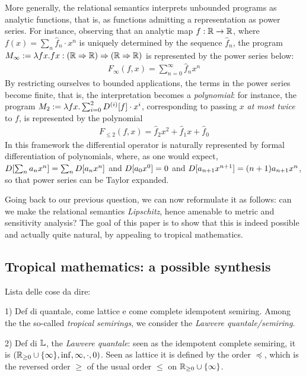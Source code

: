 More generally, the relational semantics interprets unbounded programs as analytic functions, that is, as functions admitting a representation as power series. For instance, observing that an analytic map $f: \mathbb{R}\to \mathbb{R}$, where $f(x)=\sum_{n}\widehat f_{n}\cdot x^{n}$ is uniquely determined by the sequence $\widehat f_{n}$, the program $M_{\infty}:=\lambda fx.fx: (\mathbb{R}\Rightarrow \mathbb{R})\Rightarrow (\mathbb{R}\Rightarrow \mathbb{R})$ is represented by the power series below:
\begin{align}
F_{\infty}(f,x)= \sum_{n=0}^{\infty} \widehat f_{n} x^{n}
\end{align}
By restricting ourselves to bounded applications, the terms in the power series become finite, that is, the interpretation becomes a \emph{polynomial}: for instance, the program $M_{2}:=\lambda fx. \sum_{i=0}^{2}\Der^{(i)}[f]\cdot x^{i}$, corresponding to passing $x$ \emph{at most twice} to $f$, is represented by the polynomial
\begin{align}
F_{\leq 2}(f,x)=\widehat f_{2} x^{2}  + \widehat f_{1}x +  \widehat f_{0} 
\end{align}
 In this framework the differential operator is naturally represented by formal differentiation of polynomials, where, as one would expect, 
 $\Der[\sum_{n}a_{n}x^{n}]=\sum_{n}\Der[a_{n}x^{n}]$ and $\Der[a_{0}x^{0}]=0$ and $\Der[a_{n+1}x^{n+1}]= (n+1)a_{n+1}x^{n}$, so that power series can be Taylor expanded. 
 
Going back to our previous question, we can now reformulate it as follows: can we make the relational semantics \emph{Lipschitz}, hence amenable to metric and sensitivity analysis? The goal of this paper is to show that this is indeed possible and actually quite natural, by appealing to tropical mathematics.
 
\subsection{Tropical mathematics: a possible synthesis}

{\color{red}Lista delle cose da dire:}

1) Def di quantale, come lattice e come complete idempotent semiring.
Among the the so-called \emph{tropical semirings}, we consider the \emph{Lawvere quantale/semiring}.

2) Def di $\mathbb{L}$, the \emph{Lawvere quantale}: seen as the idempotent complete semiring, it is $(\mathbb{R}_{\geq0}\cup\{\infty\},\inf,\infty,\cdot,0)$.
Seen as lattice it is defined by the order $\preceq$, which is the reversed order $\geq$ of the usual order $\leq$ on $\mathbb{R}_{\geq0}\cup\{\infty\}$.

